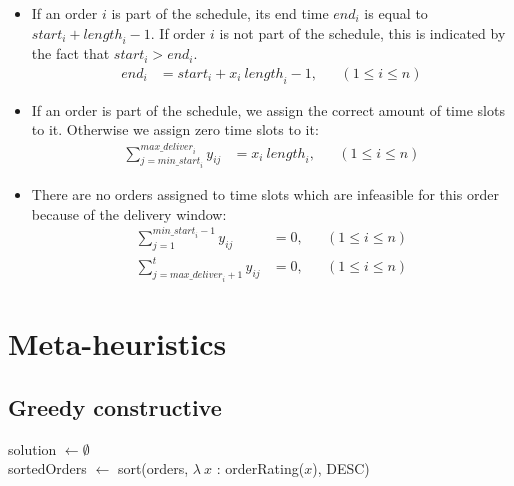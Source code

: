 \documentclass{article}
\begin{document}
\begin{itemize}
    \item If an order $i$ is part of the schedule, its end time $\mathit{end}_i$ is equal to $\mathit{start}_i + \mathit{length}_i - 1$. 
      If order $i$ is not part of the schedule, this is indicated by the fact that $\mathit{start}_i > \mathit{end}_i$.
    \begin{align}
        \mathit{end}_i &= \mathit{start}_i + x_i \: \mathit{length}_i - 1, &&(1 \leq i \leq n)
    \end{align}

     \item %
     If an order is part of the schedule, we assign the correct amount of time slots to it.
     Otherwise we assign zero time slots to it:    
    \begin{align}
        \sum^{\mathit{max\_deliver}_i}_{j = \mathit{min\_start}_i} y_{ij} &= x_i \: \mathit{length}_i, &&(1 \leq i \leq n)
    \end{align}
    
    \item There are no orders assigned to time slots which are infeasible for this order because of the delivery window:    
    \begin{align}
     \sum_{j = 1}^{\mathit{min\_start}_i-1} y_{ij} &= 0, &&(1 \leq i \leq n) \\
   \sum_{j = \mathit{max\_deliver}_i+1}^t y_{ij} &= 0, &&(1 \leq i \leq n) 
    \end{align}
\end{itemize}

\section{Meta-heuristics}
\subsection{Greedy constructive}
\begin{center}
\begin{algorithm}[H]
solution $\gets \emptyset$ \\
sortedOrders $\gets$ sort(orders, $\lambda \: x$ : orderRating($x$), DESC) \\
\;
\end{algorithm}
\end{center}
\end{document}
